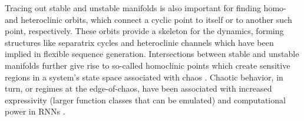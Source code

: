 \documentclass{article}
\theoremstyle{example}
\theoremstyle{plain}
\theoremstyle{definition}
\theoremstyle{remark}
\begin{document}
Tracing out stable and unstable manifolds is also important for finding homo- and heteroclinic orbits, which connect a cyclic point to itself or to another such point, respectively. These orbits provide a skeleton for the dynamics, forming structures like separatrix cycles \citep{per} and heteroclinic channels \citep{rabinovich2008transient} which have been implied in flexible sequence generation. 
Intersections between stable and unstable manifolds further give rise to so-called homoclinic points which create sensitive regions in a system's state space associated with chaos \citep{wig}. Chaotic behavior, in turn, or regimes at the edge-of-chaos, have been associated with increased expressivity (larger function classes that can be emulated) and computational power in RNNs \citep{siegelmann1992computational,bertschinger2004real,Pereira} \citep{mikhaeil2021difficulty,hess}. 
\end{document}
